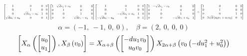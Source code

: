 \documentclass[11pt]{article}
\theoremstyle{definition}
\begin{document}
\[
\scaletoalign{\textwidth}{{\left[\begin{matrix}1 & 0 & 0 & 0\\0 & 1 & 0 & 0\\0 & \sqrt{d} u_{1} - u_{0} & 1 & 0\\\sqrt{d} u_{1} + u_{0} & 0 & 0 & 1\end{matrix}\right]} {\left[\begin{matrix}1 & \sqrt{d} v_{1} + v_{0} & 0 & 0\\0 & 1 & 0 & 0\\0 & 0 & 1 & 0\\0 & 0 & \sqrt{d} v_{1} - v_{0} & 1\end{matrix}\right]} {\left[\begin{matrix}1 & 0 & 0 & 0\\0 & 1 & 0 & 0\\0 & - \sqrt{d} u_{1} + u_{0} & 1 & 0\\- \sqrt{d} u_{1} - u_{0} & 0 & 0 & 1\end{matrix}\right]} {\left[\begin{matrix}1 & - \sqrt{d} v_{1} - v_{0} & 0 & 0\\0 & 1 & 0 & 0\\0 & 0 & 1 & 0\\0 & 0 & - \sqrt{d} v_{1} + v_{0} & 1\end{matrix}\right]} = {\left[\begin{matrix}1 & 0 & 0 & 0\\0 & 1 & 0 & 0\\0 & 0 & 1 & 0\\0 & 2 \sqrt{d} \left(u_{0} v_{1} + u_{1} v_{0}\right) & 0 & 1\end{matrix}\right]}}
\]
\[
\alpha = \left( -1, \  -1, \  0, \  0\right), \quad \beta = \left( 2, \  0, \  0, \  0\right)
\]
\[
\scaletoalign{\textwidth}{\left[ X_{\alpha}\left(\left[\begin{matrix}u_{0}\\u_{1}\end{matrix}\right]\right), X_{\beta}\left(v_{0}\right) \right] = X_{\alpha + \beta}\left(\left[\begin{matrix}- d u_{1} v_{0}\\u_{0} v_{0}\end{matrix}\right]\right) X_{2\alpha + \beta}\left(v_{0} \left(- d u_{1}^{2} + u_{0}^{2}\right)\right)}
\]
\end{document}
